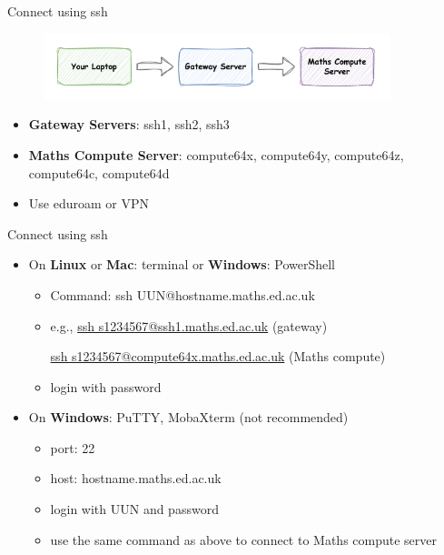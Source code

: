 \documentclass[10pt]{beamer}
\begin{document}
\begin{frame}[fragile]{Connect using ssh}

\begin{figure}[!ht]
\centering
\includegraphics[width = 0.9\textwidth]{images/maths_server_connect_steps.png}
\end{figure}

\begin{itemize}
    \item \textbf{Gateway Servers}: ssh1, ssh2, ssh3
    \item \textbf{Maths Compute Server}: compute64x, compute64y, compute64z, compute64c, compute64d
    \newline
    \item Use eduroam or VPN
\end{itemize}

\end{frame}

\begin{frame}[fragile]{Connect using ssh\footnotemark}

\begin{itemize}
    \item{
    On \textbf{Linux} or \textbf{Mac}: terminal or \textbf{Windows}: PowerShell
    \begin{itemize}
        \item Command: ssh UUN@hostname.maths.ed.ac.uk
        \item{
        e.g., \underline{ssh s1234567@ssh1.maths.ed.ac.uk} (gateway)
        
        \quad \quad \underline{ssh s1234567@compute64x.maths.ed.ac.uk} (Maths compute)
        }
        \item login with password
    \end{itemize}
    }
    \hfill
    \item{
    On \textbf{Windows}: PuTTY, MobaXterm (not recommended)
    \begin{itemize}
        \item port: 22
        \item host: hostname.maths.ed.ac.uk
        \item login with UUN and password
        \item use the same command as above to connect to Maths compute server
    \end{itemize}
    }
\end{itemize}


\end{frame}
\end{document}
